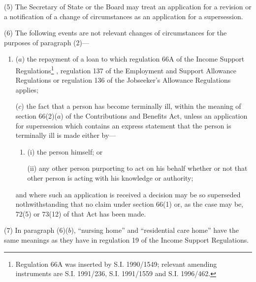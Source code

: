\documentclass[12pt,a4paper]{article}
\begin{document}
(5) The Secretary of State 
or the Board  %
may treat an application for a revision or a notification of a change of circumstances as an application for a supersession.

(6) The following events are not relevant changes of circumstances for the purposes of paragraph (2)—
\begin{enumerate}\item[]
($a$) the repayment of a loan to which regulation 66A of the Income Support Regulations\footnote{\frenchspacing Regulation 66A was inserted by S.I. 1990/1549; relevant amending instruments are S.I. 1991/236, S.I. 1991/1559 and S.I. 1996/462.}%
, regulation 137 of the Employment and Support Allowance Regulations  %
or regulation 136 of the Jobseeker’s Allowance Regulations applies;

%

($c$) the fact that a person has become terminally ill, within the meaning of section 66(2)($a$) of the Contributions and Benefits Act, unless an application for supersession which contains an express statement that the person is terminally ill is made either by—
\begin{enumerate}\item[]
(i) the person himself; or

(ii) any other person purporting to act on his behalf whether or not that other person is acting with his knowledge or authority;
\end{enumerate}
and where such an application is received a decision may be so superseded nothwithstanding that no claim under section 66(1) or, as the case may be, 72(5) or 73(12) of that Act has been made.
\end{enumerate}

(7) In paragraph (6)($b$), “nursing home” and “residential care home” have the same meanings as they have in regulation 19 of the Income Support Regulations.
\end{document}
